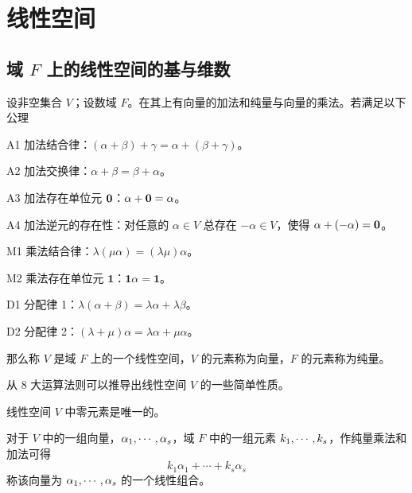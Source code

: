
\chapter{线性空间}

\section{\texorpdfstring{域 $F$ 上的线性空间的基与维数}{域 F 上的线性空间的基与维数}}

\begin{definition}[线性空间]
    设非空集合 $V$；设数域 $F$。在其上有向量的加法和纯量与向量的乘法。若满足以下公理
    
    A1 加法结合律：$(\alpha+\beta) + \gamma = \alpha +(\beta+\gamma)$。
    
    A2 加法交换律：$\alpha + \beta = \beta + \alpha$。
    
    A3 加法存在单位元 $\boldsymbol{0}$：$\alpha + \boldsymbol{0} = \alpha$。
    
    A4 加法逆元的存在性：对任意的 $\alpha \in V$ 总存在 $-\alpha\in V$，使得 $\alpha + (-\alpha) = \boldsymbol{0}$。
    
    M1 乘法结合律：$\lambda(\mu \alpha) = (\lambda \mu) \alpha$。
    
    M2 乘法存在单位元 $\boldsymbol{1}$：$\boldsymbol{1} \alpha = \boldsymbol{1}$。
    
    D1 分配律 1：$\lambda(\alpha+\beta) = \lambda \alpha + \lambda \beta$。
    
    D2 分配律 2：$(\lambda + \mu)\alpha = \lambda \alpha + \mu \alpha$。
    
    那么称 $V$ 是域 $F$ 上的一个线性空间，$V$ 的元素称为向量，$F$ 的元素称为纯量。
\end{definition}

从 $8$ 大运算法则可以推导出线性空间 $V$ 的一些简单性质。

\begin{theorem}
    线性空间 $V$ 中零元素是唯一的。
\end{theorem}

对于 $V$ 中的一组向量，$\alpha_1,\cdots,\alpha_s$，域 $F$ 中的一组元素 $k_1,\cdots,k_s$，作纯量乘法和加法可得
\[ k_1\alpha_1+\cdots+k_s\alpha_s \]
称该向量为 $\alpha_1,\cdots,\alpha_s$ 的一个线性组合。

